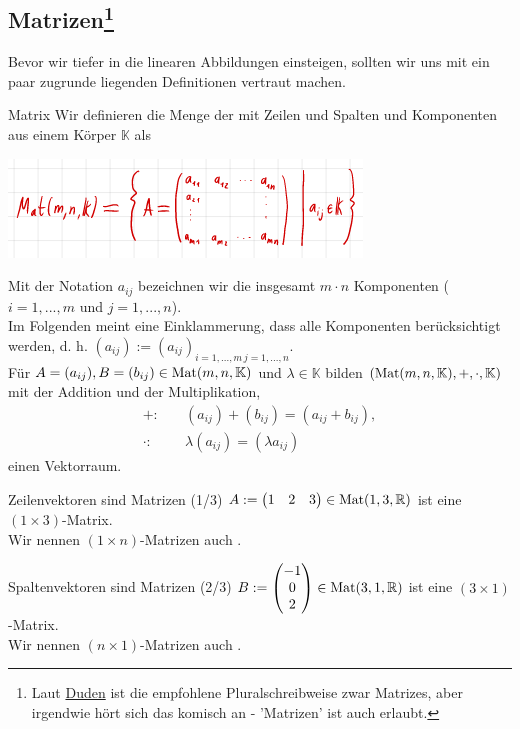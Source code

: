 \subsection[Matrizen]{Matrizen\footnote{Laut \href{https://www.duden.de/rechtschreibung/Matrix}{Duden} ist die empfohlene Pluralschreibweise zwar Matrizes, aber irgendwie hört sich das komisch an - 'Matrizen' ist auch erlaubt.}}
Bevor wir tiefer in die linearen Abbildungen einsteigen, sollten wir uns mit ein paar zugrunde liegenden Definitionen vertraut machen.
\begin{Def}
{Matrix}
Wir definieren die Menge der  mit  Zeilen und  Spalten und Komponenten aus einem Körper $\mathbb{K}$ als
\begin{center}
    \includegraphics[width=.5\textwidth]{Dateien/00/12Matrixdefinition.PNG}
\end{center}
Mit der Notation $a_{ij}$ bezeichnen wir die insgesamt $m\cdot n$ Komponenten ($i=1,...,m$ und $j=1,...,n$).\\
Im Folgenden meint eine Einklammerung, dass alle Komponenten berücksichtigt werden, d. h. $(a_{ij}):=(a_{ij})_{i=1,...,m\, j=1,...,n}$.\\
Für $A=(a_{ij}), B=(b_{ij})\in\text{Mat}(m,n,\mathbb{K})$ und $\lambda\in\mathbb{K}$ bilden $(\text{Mat}(m,n,\mathbb{K}),+,\cdot, \mathbb{K})$ mit der Addition und der Multiplikation,
\begin{align*}
    +:&\quad(a_{ij})+(b_{ij})=(a_{ij}+b_{ij}),\\
    \cdot : & \quad\lambda (a_{ij})=(\lambda a_{ij})
\end{align*}
einen Vektorraum.
\end{Def}
\begin{Beispiel}
{Zeilenvektoren sind Matrizen (1/3)}
$A:=\begin{pmatrix}1 &2&3\end{pmatrix}\in\text{Mat}(1,3,\mathbb{R})$ ist eine $(1\times 3)$-Matrix.\\
Wir nennen $(1\times n)$-Matrizen auch .
\end{Beispiel}
\begin{Beispiel}
{Spaltenvektoren sind Matrizen (2/3)}
$B:=\begin{pmatrix}-1\\0\\2\end{pmatrix}\in\text{Mat}(3,1,\mathbb{R})$ ist eine $(3\times 1)$-Matrix.\\
Wir nennen $(n\times 1)$-Matrizen auch .
\end{Beispiel}
